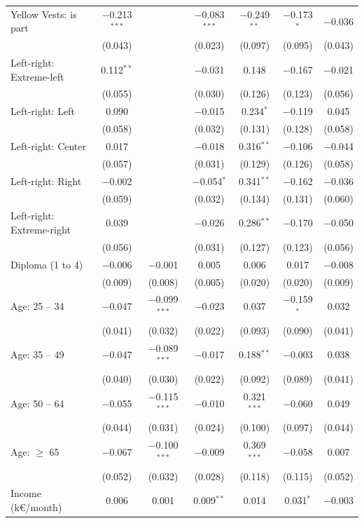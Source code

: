 \documentclass[english,5p,authoryear]{elsarticle}
\begin{document}
\begin{table}[!htbp]
{\begin{tabular}{@{\extracolsep{5pt}}lcccccc}
  Yellow Vests: is part & $-$0.213$^{***}$ &  & $-$0.083$^{***}$ & $-$0.249$^{**}$ & $-$0.173$^{*}$ & $-$0.036 \\ 
  & (0.043) &  & (0.023) & (0.097) & (0.095) & (0.043) \\ 
  Left-right: Extreme-left & 0.112$^{**}$ &  & $-$0.031 & 0.148 & $-$0.167 & $-$0.021 \\ 
  & (0.055) &  & (0.030) & (0.126) & (0.123) & (0.056) \\ 
  Left-right: Left & 0.090 &  & $-$0.015 & 0.234$^{*}$ & $-$0.119 & 0.045 \\ 
  & (0.058) &  & (0.032) & (0.131) & (0.128) & (0.058) \\ 
  Left-right: Center & 0.017 &  & $-$0.018 & 0.316$^{**}$ & $-$0.106 & $-$0.044 \\ 
  & (0.057) &  & (0.031) & (0.129) & (0.126) & (0.058) \\ 
  Left-right: Right & $-$0.002 &  & $-$0.054$^{*}$ & 0.341$^{**}$ & $-$0.162 & $-$0.036 \\ 
  & (0.059) &  & (0.032) & (0.134) & (0.131) & (0.060) \\ 
  Left-right: Extreme-right & 0.039 &  & $-$0.026 & 0.286$^{**}$ & $-$0.170 & $-$0.050 \\ 
  & (0.056) &  & (0.031) & (0.127) & (0.123) & (0.056) \\ 
  Diploma (1 to 4) & $-$0.006 & $-$0.001 & 0.005 & 0.006 & 0.017 & $-$0.008 \\ 
  & (0.009) & (0.008) & (0.005) & (0.020) & (0.020) & (0.009) \\ 
  Age: 25 -- 34 & $-$0.047 & $-$0.099$^{***}$ & $-$0.023 & 0.037 & $-$0.159$^{*}$ & 0.032 \\ 
  & (0.041) & (0.032) & (0.022) & (0.093) & (0.090) & (0.041) \\ 
  Age: 35 -- 49 & $-$0.047 & $-$0.089$^{***}$ & $-$0.017 & 0.188$^{**}$ & $-$0.003 & 0.038 \\ 
  & (0.040) & (0.030) & (0.022) & (0.092) & (0.089) & (0.041) \\ 
  Age: 50 -- 64 & $-$0.055 & $-$0.115$^{***}$ & $-$0.010 & 0.321$^{***}$ & $-$0.060 & 0.049 \\ 
  & (0.044) & (0.031) & (0.024) & (0.100) & (0.097) & (0.044) \\ 
  Age: $\geq$ 65 & $-$0.067 & $-$0.100$^{***}$ & $-$0.009 & 0.369$^{***}$ & $-$0.058 & 0.007 \\ 
  & (0.052) & (0.032) & (0.028) & (0.118) & (0.115) & (0.052) \\ 
  Income (k\euro{}/month) & 0.006 & 0.001 & 0.009$^{**}$ & 0.014 & 0.031$^{*}$ & $-$0.003 \\ 

\end{tabular}}
\end{table}
\end{document}
